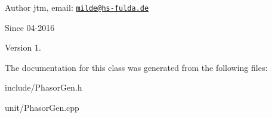 \begin{DoxyAuthor}{Author}
jtm, email\+:  \href{mailto:milde@hs-fulda.de}{\tt milde@hs-\/fulda.\+de} 
\end{DoxyAuthor}
\begin{DoxySince}{Since}
04-\/2016 
\end{DoxySince}
\begin{DoxyVersion}{Version}
1. 
\end{DoxyVersion}


The documentation for this class was generated from the following files\+:\begin{DoxyCompactItemize}
\item 
include/Phasor\+Gen.\+h\item 
unit/Phasor\+Gen.\+cpp\end{DoxyCompactItemize}
